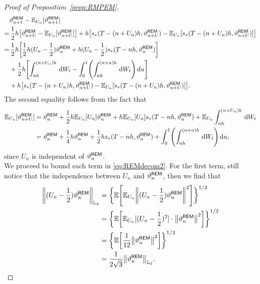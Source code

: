 \begin{proof}[Proof of Proposition~\ref{prop:RMPEM}]
\begin{equation}
    \begin{aligned}
        &\vartheta_{n+1}^{\sf REM}-\mathbb{E}_{U_n}[\vartheta_{n+1}^{\sf REM}]\\
        =&\,\dfrac{1}{2}h\left[\vartheta_{n+U}^{\sf REM}-\mathbb{E}_{U_n}[\vartheta_{n+U}^{\sf REM}]\right]+h\left[s_*(T-(n+U_n)h,\vartheta_{n+U}^{\sf REM})-\mathbb{E}_{U_n}[s_*(T-(n+U_n)h,\vartheta_{n+U}^{\sf REM})]\right]\\
        =&\,\dfrac{1}{2}h\left[\dfrac{1}{2}h(U_n-\dfrac{1}{2})\vartheta_n^{\sf REM}+h(U_n-\dfrac{1}{2})s_*(T-nh,\vartheta_n^{\sf REM})\right]\\
        &+\dfrac{1}{2}h\left[\int_{nh}^{(n+U_n)h}\rmd W_t-\int_0^1\left(\int_{nh}^{(n+u)h}\rmd W_t\right)\rmd u\right]\\
        &+h\left[s_*(T-(n+U_n)h,\vartheta_{n+U}^{\sf REM})-\mathbb{E}_{U_n}[s_*(T-(n+U_n)h,\vartheta_{n+U}^{\sf REM})]\right].
    \end{aligned}
    \label{eq:REMdecom2}
\end{equation}
The second equality follows from the fact that
\begin{align*}
    \mathbb{E}_{U_n}[\vartheta_{n+U}^{\sf REM}]&=\vartheta_n^{\sf REM}+\dfrac{1}{2}h\mathbb{E}_{U_n}[U_n]\vartheta_n^{\sf REM}+h\mathbb{E}_{U_n}[U_n]s_*(T-nh,\vartheta_n^{\sf REM})+\mathbb{E}_{U_n}\int_{nh}^{(n+U_n)h}\rmd W_t\\
    &=\vartheta_n^{\sf REM}+\dfrac{1}{4}h\vartheta_n^{\sf REM}+\dfrac{1}{2}hs_*(T-nh,\vartheta_n^{\sf REM})+\int_0^1\left(\int_{nh}^{(n+u)h}\rmd W_t\right)\rmd u,
\end{align*}
since $U_n$ is independent of $\vartheta_n^{\sf REM}$.\\
We proceed to bound each term in \eqref{eq:REMdecom2}. For the first term, still notice that the independence between $U_n$ and $\vartheta_n^{\sf REM}$, then we find that
\begin{align*}
    \l|(U_n-\dfrac{1}{2})\vartheta_n^{\sf REM}\r|_{\Ltwo}&=\bigg\{\mathbb{E}\left[\mathbb{E}_{U_n}\left\lVert (U_n-\dfrac{1}{2})\vartheta_n^{\sf REM}\right\rVert^2\right]\bigg\}^{1/2}\\
    &=\bigg\{\mathbb{E}\left[\mathbb{E}_{U_n}[(U_n-\dfrac{1}{2})^2]\cdot\left\lVert\vartheta_n^{\sf REM}\right\rVert^2\right]\bigg\}^{1/2}\\
    &=\bigg\{\mathbb{E}\left[\dfrac{1}{12}\l|\vartheta_n^{\sf REM}\r|^2\right]\bigg\}^{1/2}\\
    &=\dfrac{1}{2\sqrt{3}}\l|\vartheta_n^{\sf REM}\r|_{\Ltwo}.

\end{align*}
\end{proof}
